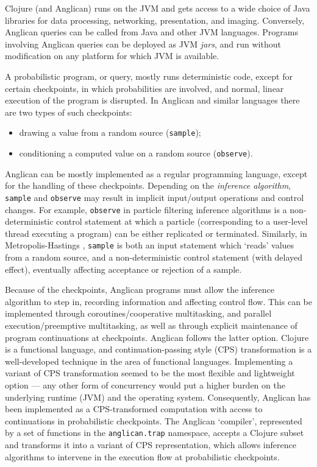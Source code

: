 \documentclass[preprint]{sigplanconf}
\begin{document}
Clojure (and Anglican) runs on the JVM and gets access to a wide choice of Java
libraries for data processing, networking, presentation, and imaging.
Conversely, Anglican queries can be called from Java and other JVM languages.
Programs involving Anglican queries can be deployed as JVM
\textit{jars}, and run without modification on any platform for
which JVM is available.

A probabilistic program, or query, mostly runs deterministic
code, except for certain checkpoints, in which probabilities are
involved, and normal, linear execution of the program is
disrupted. In Anglican and similar languages there are two types
of such checkpoints:

\begin{itemize}
    \item drawing a value from a random source (\texttt{sample});
    \item conditioning a computed value on a random source
        (\texttt{observe}).
\end{itemize}

Anglican can be mostly implemented as a regular programming
language, except for the handling of these checkpoints.
Depending on the \textit{inference algorithm}, \texttt{sample}
and \texttt{observe} may result in implicit input/output
operations and control changes. For example, \texttt{observe} in
particle filtering inference algorithms \cite{WVM14} is a non-deterministic
control statement at which a particle (corresponding to
a user-level thread executing a program)
can be either replicated or terminated. Similarly, in 
Metropolis-Hastings \cite{WSG11},
\texttt{sample} is both an input
statement which `reads' values from a random source,
and a non-deterministic control statement
(with delayed effect), eventually affecting acceptance or
rejection of a sample.

Because of the checkpoints, Anglican programs must allow the
inference algorithm to step in, recording information and
affecting control flow. This can be implemented through
coroutines/cooperative multitasking, and parallel execution/preemptive
multitasking, as well as through explicit
maintenance of program continuations at checkpoints. Anglican
follows the latter option. Clojure is
a functional language, and continuation-passing style (CPS)
transformation is a well-developed technique in the area of
functional languages. Implementing a variant of CPS
transformation seemed to be the most flexible and lightweight
option --- any other form of concurrency would put a higher burden
on the underlying runtime (JVM) and the operating system.
Consequently, Anglican has been implemented as a CPS-transformed
computation with access to continuations in probabilistic
checkpoints. The Anglican `compiler', represented by a set of
functions in the \texttt{anglican.trap} namespace, accepts a
Clojure subset and transforms it into a variant of CPS
representation, which allows inference algorithms to intervene
in the execution flow at probabilistic checkpoints.
\end{document}
